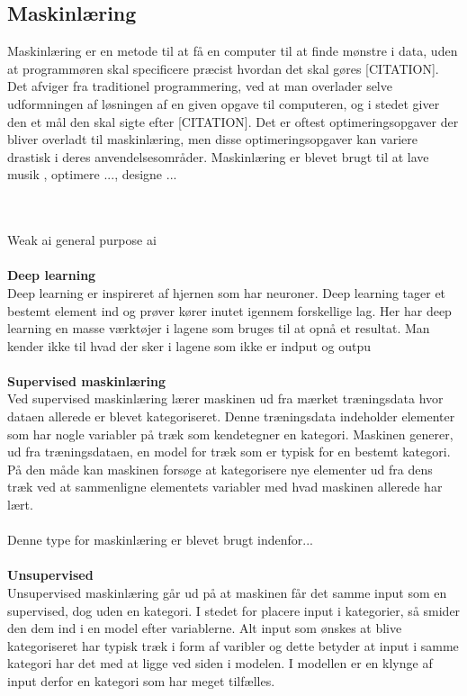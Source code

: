 \subsection{Maskinlæring}
Maskinlæring er en metode til at få en computer til at finde mønstre i data, uden at programmøren skal specificere præcist hvordan det skal gøres [CITATION]. Det afviger fra traditionel programmering, ved at man overlader selve udformningen af løsningen af en given opgave til computeren, og i stedet giver den et mål den skal sigte efter [CITATION]. Det er oftest optimeringsopgaver der bliver overladt til maskinlæring, men disse optimeringsopgaver kan variere drastisk i deres anvendelsesområder. Maskinlæring er blevet brugt til at lave musik \cite{mlmusic}, optimere ..., designe ...

\\\\
Weak ai
general purpose ai
\\\\
\textbf{Deep learning}\\
Deep learning er inspireret af hjernen som har neuroner. Deep learning tager et bestemt element ind og prøver kører inutet igennem forskellige lag. Her har deep learning en masse værktøjer i lagene som bruges til at opnå et resultat. Man kender ikke til hvad der sker i lagene som ikke er indput og outpu 
\\\\
\textbf{Supervised maskinlæring}\\
Ved supervised maskinlæring lærer maskinen ud fra mærket træningsdata hvor dataen allerede er blevet kategoriseret. Denne træningsdata indeholder elementer som har nogle variabler på træk som kendetegner en kategori. Maskinen generer, ud fra træningsdataen, en model for træk som er typisk for en bestemt kategori. På den måde kan maskinen forsøge at kategorisere nye elementer ud fra dens træk ved at sammenligne elementets variabler med hvad maskinen allerede har lært.
\\\\
Denne type for maskinlæring er blevet brugt indenfor...
\\\\
\textbf{Unsupervised}\\
Unsupervised maskinlæring går ud på at maskinen får det samme input som en supervised, dog uden en kategori. I stedet for placere input i kategorier, så smider den dem ind i en model efter variablerne. Alt input som ønskes at blive kategoriseret har typisk træk i form af varibler og dette betyder at input i samme kategori har det med at ligge ved siden i modelen. I modellen er en klynge af input derfor en kategori som har meget tilfælles.
